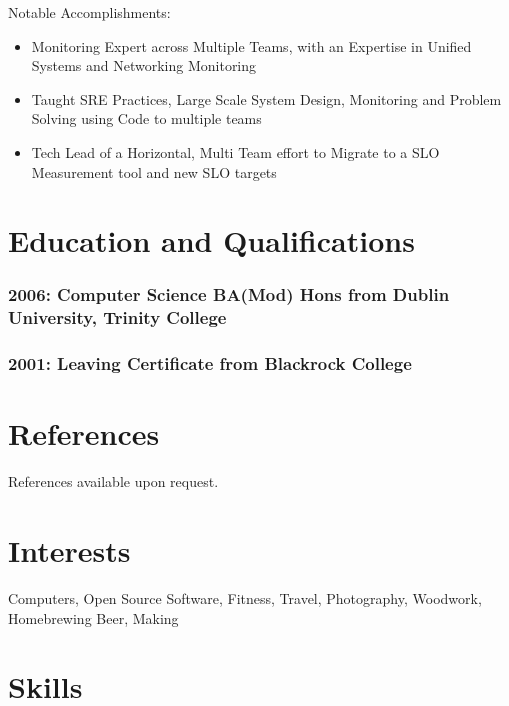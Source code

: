 \documentclass[a4paper, 10pt] {article}
\begin{document}
Notable Accomplishments:

\begin{itemize}
  \item Monitoring Expert across Multiple Teams, with an Expertise in Unified Systems and Networking Monitoring
  \item Taught SRE Practices, Large Scale System Design, Monitoring and Problem Solving using Code to multiple teams
  \item Tech Lead of a Horizontal, Multi Team effort to Migrate to a SLO Measurement tool and new SLO targets
\end{itemize}

\section*{Education and Qualifications}

\subsubsection*{2006: Computer Science BA(Mod) Hons from Dublin University, Trinity College}

\subsubsection*{2001: Leaving Certificate from Blackrock College}

\section*{References}

References available upon request.

\section*{Interests}

Computers, Open Source Software, Fitness, Travel, Photography, Woodwork, Homebrewing Beer, Making

\section*{Skills}
\end{document}
